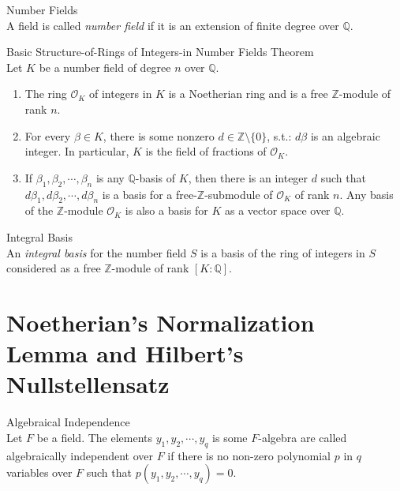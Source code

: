 \begin{definition}{Number Fields}\\
A field is called \textit{number field} if it is an extension of finite degree over $\mathbb{Q}$.
\end{definition}

\begin{theorem}{Basic Structure-of-Rings of Integers-in Number Fields Theorem}\\
Let $K$ be a number field of degree $n$ over $\mathbb{Q}$.
\begin{enumerate}
    \item The ring $\mathcal{O}_K$ of integers in $K$ is a Noetherian ring and is a free $\mathbb{Z}$-module of rank $n$.

    \item For every $\beta \in K$, there is some nonzero $d\in \mathbb{Z} \setminus \{0\}$, s.t.: $d\beta$ is an algebraic integer. In particular, $K$ is the field of fractions of $\mathcal{O}_K$.

    \item If $\beta_1 ,\beta_2 ,\cdots, \beta_n$ is any $\mathbb{Q}$-basis of $K$, then there is an integer $d$ such that $d\beta_1 ,d\beta_2 ,\cdots, d\beta_n$ is a basis for a free-$\mathbb{Z}$-submodule of $\mathcal{O}_K$ of rank $n$. Any basis of the $\mathbb{Z}$-module $\mathcal{O}_K$ is also a basis for $K$ as a vector space over $\mathbb{Q}$.
\end{enumerate}
\end{theorem}

\begin{definition}{Integral Basis}\\
An \textit{integral basis} for the number field $S$ is a basis of the ring of integers in $S$ considered as a free $\mathbb{Z}$-module of rank $[K:\mathbb{Q}]$.
\end{definition}

\section{Noetherian's Normalization Lemma and Hilbert's Nullstellensatz}

\begin{definition}{Algebraical Independence}\\
Let $F$ be a field. The elements $y_1 ,y_2,\cdots, y_q$ is some $F$-algebra are called algebraically independent over $F$ if there is no non-zero polynomial $p$ in $q$ variables over $F$ such that $p(y_1,y_2 ,\cdots, y_q)=0$.
\end{definition}

